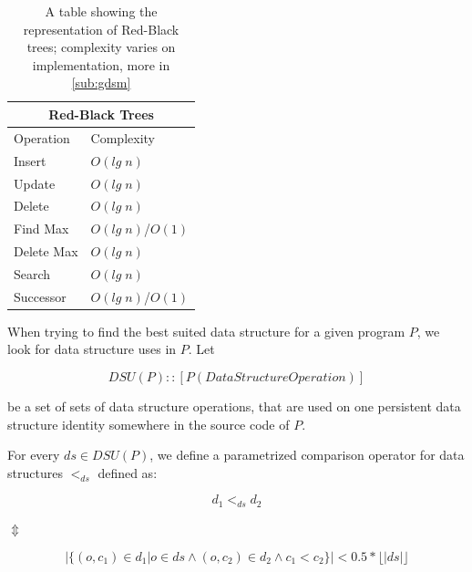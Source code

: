 \documentclass[a4paper,11pt]{article}
\begin{document}
		\begin{table}[h!]
			\centering
			\begin{tabular}{|l|l|}
				\hline
				\multicolumn{2}{|c|}{Red-Black Trees} \\
				\hline
				Operation & Complexity \\
				\hline
				Insert 	        & $O(lg \; n)$ \\
				Update          & $O(lg \; n)$ \\
				Delete	        & $O(lg \; n)$ \\
				Find Max 	& $O(lg \; n)$/$O(1)$\\
				Delete Max	& $O(lg \; n)$ \\
				Search 		& $O(lg \; n)$ \\
				Successor 	& $O(lg \; n)$/$O(1)$\\
				\hline
			\end{tabular}
			\caption{A table showing the representation of Red-Black trees; complexity varies on
			implementation, more in \autoref{sub:gdsm}}
			\label{tab:rbt}
		\end{table}

		When trying to find the best suited data structure for a given program $P$, we look for data structure
		uses in $P$. Let

		\begin{equation} \label{dsu-type}
			DSU(P) :: [P(DataStructureOperation)]
		\end{equation}

		be a set of sets of data structure operations, that are used on one persistent data structure identity
		somewhere in the source code of $P$.

		For every $ds \in DSU(P)$, we define a parametrized comparison operator for data structures $<_{ds}$
		defined as:

		\begin{center}

			\begin{equation}
				d_1 <_{ds} d_2
			\end{equation}

			$\Updownarrow$

			\begin{equation} \label{data-structure-order}
				|\{(o, c_1) \in d_1 | o \in ds \wedge (o,c_2) \in d_2 \wedge c_1 < c_2 \}| < 0.5 *
				\lfloor |ds| \rfloor
			\end{equation}

		\end{center}
\end{document}
